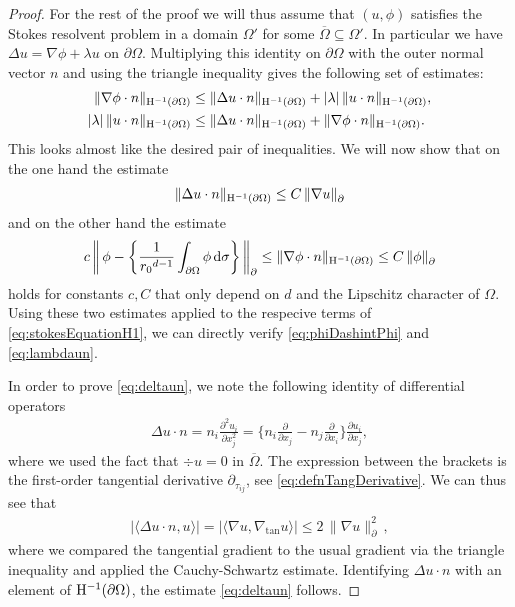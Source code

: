 \begin{proof}
  For the rest of the proof we will thus assume that $(u,\phi)$ satisfies the Stokes resolvent problem in a domain $\Omega'$ for some $\overline \Omega \subseteq \Omega'$.
  In particular we have $\Delta u = \nabla \phi + \lambda u$  on $\partial\Omega$.
  Multiplying this identity  on $\partial\Omega$ with the outer normal vector $n$ and using the triangle inequality gives the following set of estimates:
  \begin{align}
    \label{eq:stokesEquationH1}
    \begin{alignedat}{1}
    \|\nabla \phi \cdot n\|_{\mathrm{H}^{-1}(\partial\Omega)} 
    &\leq \|\Delta u \cdot n \|_{\mathrm{H}^{-1}(\partial\Omega)} + |\lambda|\, \| u\cdot n\|_{\mathrm{H}^{-1}(\partial\Omega)}, \\
    |\lambda|\, \| u\cdot n \|_{\mathrm{H}^{-1}(\partial\Omega)} 
    &\leq \|\Delta u \cdot n \|_{\mathrm{H}^{-1}(\partial\Omega)} + \|\nabla \phi \cdot n \|_{\mathrm{H}^{-1}(\partial\Omega)}.
    \end{alignedat}
  \end{align}
  This looks almost like the desired pair of inequalities.
  We will now show that on the one hand the estimate
  \begin{align}
    \label{eq:deltaun}
    \|\Delta u \cdot n\|_{\mathrm{H}^{-1}(\partial\Omega)}
    \leq C\, \|\nabla u\|^{}_\partial
  \end{align}
  and on the other hand the estimate
  \begin{align}
    \label{eq:nablaPhin}
    c \, \bigg\|\,\phi - \bigg\{ \frac{1}{{r_0}^{d - 1}}\int_{\partial\Omega} \phi \, {\operatorname{d}\!{\sigma}} \bigg\} \, \bigg\|^{}_\partial 
    \leq \|\nabla \phi \cdot n\|_{\mathrm{H}^{-1}(\partial\Omega)}
    \leq C\,  \|\phi\|^{}_\partial
  \end{align}
  holds for constants $c, C$ that only depend on $d$ and the Lipschitz character of $\Omega$.
  Using these two estimates applied to the respecive terms of \eqref{eq:stokesEquationH1}, we can directly verify \eqref{eq:phiDashintPhi} and \eqref{eq:lambdaun}.

  In order to prove \eqref{eq:deltaun}, we note the following identity of differential operators
  \begin{align*}
    \Delta u \cdot n = n_i \frac{\partial^2 u_i}{\partial x_j^2} = \Big\{ n_i \frac{\partial}{\partial x_j} - n_j \frac{\partial}{\partial x_i} \Big\} \frac{\partial u_i}{\partial x_j},
  \end{align*}
  where we used the fact that $\div u = 0$ in $\overline \Omega$.
  The expression between the brackets is the first-order tangential derivative $\partial_{\tau_{ij}}$, see \eqref{eq:defnTangDerivative}. 
  We can thus see that
  \begin{align*}
    \big| \langle \Delta u \cdot n, u \rangle \big| = \big| \langle \nabla u, \nabla_{\mathrm{tan}} u \rangle\big| \leq 2\, \|\nabla u\|_\partial^2\,,
  \end{align*}
  where we compared the tangential gradient to the usual gradient via the triangle inequality and applied the Cauchy-Schwartz estimate.  
  Identifying $\Delta u \cdot n$ with an element of $\mathrm{H}^{-1}(\partial\Omega)$, the estimate \eqref{eq:deltaun} follows. 


\end{proof}
